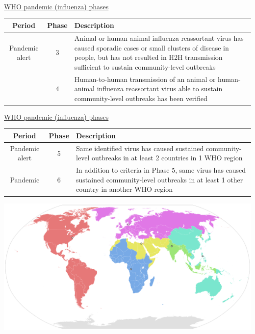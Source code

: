 \documentclass[aspectratio=169]{beamer}\usepackage[]{graphicx}\usepackage[]{xcolor}
\begin{document}
\begin{frame}{\href{https://www.ncbi.nlm.nih.gov/books/NBK143061/}{WHO pandemic (influenza) phases}}
\begin{tabular}{ccp{6cm}}
Period & Phase & Description \\
\hline 
\rowcolor{yellow} Pandemic alert & 3 & Animal or human-animal influenza reassortant virus has caused sporadic cases or small clusters of disease in people, but has not resulted in H2H transmission sufficient to sustain community-level outbreaks \\
\rowcolor{yellow} & 4 & Human-to-human transmission of an animal or human-animal influenza reassortant virus able to sustain community-level outbreaks has been verified 
\end{tabular}
\end{frame}

\begin{frame}{\href{https://www.ncbi.nlm.nih.gov/books/NBK143061/}{WHO pandemic (influenza) phases}}
\begin{tabular}{ccp{6cm}}
    Period & Phase & Description \\
    \hline 
\rowcolor{orange} Pandemic alert & 5 & Same identified virus has caused sustained community-level outbreaks in at least 2 countries in 1 WHO region \\
\rowcolor{lred} Pandemic & 6 & In addition to criteria in Phase 5, same virus has caused sustained community-level outbreaks in at least 1 other country in another WHO region
\end{tabular}
\end{frame}

\begin{frame}
    \includegraphics[width=\textwidth]{FIGS/1280px-World_Health_Organisation_regional_offices.png}
\end{frame}
\end{document}
